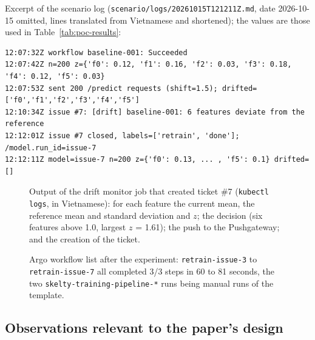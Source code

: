 \medskip
\noindent Excerpt of the scenario log (\texttt{scenario/logs/20261015T121211Z.md}, date 2026-10-15 omitted, lines translated from Vietnamese and shortened); the values are those used in Table~\ref{tab:poc-results}:

\begin{tcolorbox}[colback=gray!6,colframe=gray!55,boxrule=0.4pt,left=3pt,right=3pt,top=2pt,bottom=2pt]
\scriptsize
\begin{verbatim}
12:07:32Z workflow baseline-001: Succeeded
12:07:42Z n=200 z={'f0': 0.12, 'f1': 0.16, 'f2': 0.03, 'f3': 0.18, 'f4': 0.12, 'f5': 0.03}
12:07:53Z sent 200 /predict requests (shift=1.5); drifted=['f0','f1','f2','f3','f4','f5']
12:10:34Z issue #7: [drift] baseline-001: 6 features deviate from the reference
12:12:01Z issue #7 closed, labels=['retrain', 'done']; /model.run_id=issue-7
12:12:11Z model=issue-7 n=200 z={'f0': 0.13, ... , 'f5': 0.1} drifted=[]
\end{verbatim}
\end{tcolorbox}

\begin{figure}[t]
\centering
{}
\caption{Output of the drift monitor job that created ticket \#7 (\texttt{kubectl logs}, in Vietnamese): for each feature the current mean, the reference mean and standard deviation and $z$; the decision (six features above 1.0, largest $z$ = 1.61); the push to the Pushgateway; and the creation of the ticket.}
\label{fig:poc-monitor}
\end{figure}

\begin{figure}[t]
\centering
{}
\caption{Argo workflow list after the experiment: \texttt{retrain-issue-3} to \texttt{retrain-issue-7} all completed 3/3 steps in 60 to 81 seconds, the two \texttt{skelty-training-pipeline-*} runs being manual runs of the template.}
\label{fig:poc-workflows}
\end{figure}

\subsection{Observations relevant to the paper's design}

